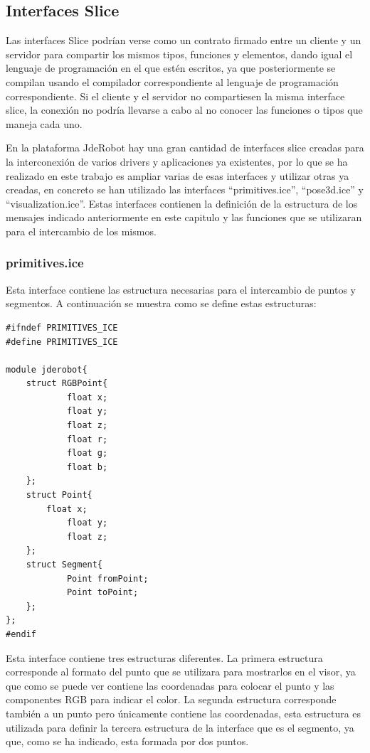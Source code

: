 \subsection{Interfaces Slice}
Las interfaces Slice podrían verse como un contrato firmado entre un cliente y un servidor para compartir los mismos tipos, funciones y elementos, dando igual el lenguaje de programación en el que estén escritos, ya que posteriormente se compilan usando el compilador correspondiente al lenguaje de programación correspondiente. Si el cliente y el servidor no compartiesen la misma interface slice, la conexión no podría llevarse a cabo al no conocer las funciones o tipos que maneja cada uno.

En la plataforma JdeRobot hay una gran cantidad de interfaces slice creadas para la interconexión de varios drivers y aplicaciones ya existentes, por lo que se ha realizado en este trabajo es ampliar varias de esas interfaces y utilizar otras ya creadas, en concreto se han utilizado las interfaces ``primitives.ice'', ``pose3d.ice'' y ``visualization.ice''. Estas interfaces contienen la definición de la estructura de los mensajes indicado anteriormente en este capitulo y las funciones que se utilizaran para el intercambio de los mismos.

\subsubsection{primitives.ice}
Esta interface contiene las estructura necesarias para el intercambio de puntos y segmentos. A continuación se muestra como se define estas estructuras:

\begin{lstlisting}[frame=single]
#ifndef PRIMITIVES_ICE
#define PRIMITIVES_ICE

module jderobot{
	struct RGBPoint{
      		float x;
      		float y;
      		float z;
      		float r;
      		float g;
      		float b;
	};
	struct Point{
		float x;
	    	float y;
	    	float z;
	};
	struct Segment{
	    	Point fromPoint;
	    	Point toPoint;
	};
};
#endif
\end{lstlisting}
Esta interface contiene tres estructuras diferentes. La primera estructura corresponde al formato del punto que se utilizara para mostrarlos en el visor, ya que como se puede ver contiene las coordenadas para colocar el punto y las componentes RGB para indicar el color. La segunda estructura corresponde también a un punto pero únicamente contiene las coordenadas, esta estructura es utilizada para definir la tercera estructura de la interface que es el segmento, ya que, como se ha indicado, esta formada por dos puntos. 

